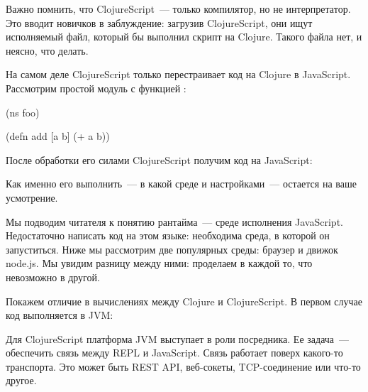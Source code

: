 Важно помнить, что ClojureScript~--- только компилятор, но не интерпретатор. Это вводит новичков в заблуждение: загрузив ClojureScript, они ищут исполняемый файл, который бы выполнил скрипт на Clojure. Такого файла нет, и неясно, что делать.

На самом деле ClojureScript только перестраивает код на Clojure в JavaScript. Рассмотрим простой модуль  с функцией :

\begin{english}
  \begin{clojure}
(ns foo)

(defn add [a b]
  (+ a b))
  \end{clojure}
\end{english}

После обработки его силами ClojureScript получим код на JavaScript:

\begin{english}
\end{english}

Как именно его выполнить~--- в какой среде и настройками~--- остается на ваше усмотрение.

Мы подводим читателя к понятию рантайма~--- среде исполнения JavaScript. Недостаточно написать код на этом языке: необходима среда, в которой он запуститься. Ниже мы рассмотрим две популярных среды: браузер и движок node.js. Мы увидим разницу между ними: проделаем в каждой то, что невозможно в другой.

Покажем отличие в вычислениях между Clojure и ClojureScript. В первом случае код выполняется в JVM:

\begin{figure}[H]
  \centering
  
  \label{fig:chart-repl-03}
\end{figure}

Для ClojureScript платформа JVM выступает в роли посредника. Ее задача~--- обеспечить связь между REPL и JavaScript. Связь работает поверх какого-то транспорта. Это может быть REST API, веб-сокеты, TCP-соединение или что-то другое.

\begin{figure}[H]
  \centering
  
  \label{fig:chart-repl-04}
\end{figure}

